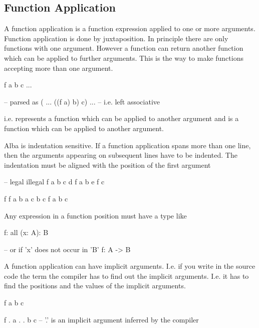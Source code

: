 \subsection{Function Application}

A function application is a function expression applied to one or more
arguments. Function application is done by juxtaposition. In principle there are
only functions with one argument. However a function can return another function
which can be applied to further arguments. This is the way to make functions
accepting more than one argument.

\begin{alba}
    f a b c ...

    -- parsed as
    ( ... ((f a) b) c) ...  -- i.e. left associative
\end{alba}
i.e.  represents a function which can be applied to another argument
and  is a function which can be applied to another argument.

Alba is indentation sensitive. If a function application spans more than one
line, then the arguments appearing on subsequent  lines have to be indented. The
indentation must be aligned with the position of the first argument
\begin{alba}
    -- legal                                illegal
    f a b c d                               f  a b
      e f                                    c

    f                                       f  a b
        a                                        c
        b
        c                                   f
                                            a b c
\end{alba}




Any expression in a function position must have a type like
\begin{alba}
    f: all (x: A): B

    -- or if 'x' does not occur in 'B'
    f: A -> B
\end{alba}

A function application can have implicit arguments. I.e. if you write in the
source code the term  the compiler has to find out the implicit
arguments. I.e. it has to find the positions and the values of the implicit
arguments.
\begin{alba}
    f a b c

    f . a . . b c    -- '.' is an implicit argument inferred by the compiler
\end{alba}

